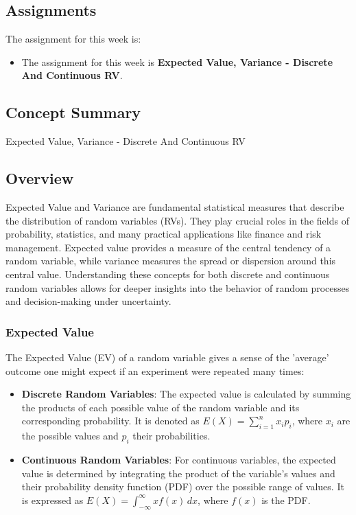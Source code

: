 \subsection{Assignments}

The assignment for this week is:

\begin{itemize}
    \item The assignment for this week is \textbf{Expected Value, Variance - Discrete And Continuous RV}. 
\end{itemize}

\subsection{Concept Summary}

\begin{notes}{Expected Value, Variance - Discrete And Continuous RV}
    \subsection*{Overview}

    Expected Value and Variance are fundamental statistical measures that describe the distribution of random variables (RVs). They play crucial roles in the fields of probability, statistics, and 
    many practical applications like finance and risk management. Expected value provides a measure of the central tendency of a random variable, while variance measures the spread or dispersion 
    around this central value. Understanding these concepts for both discrete and continuous random variables allows for deeper insights into the behavior of random processes and decision-making 
    under uncertainty. \vspace*{1em}
    
    \subsubsection*{Expected Value}
    
    The Expected Value (EV) of a random variable gives a sense of the 'average' outcome one might expect if an experiment were repeated many times:
    \begin{itemize}
        \item \textbf{Discrete Random Variables}: The expected value is calculated by summing the products of each possible value of the random variable and its corresponding probability. It is denoted 
        as $E(X) = \sum_{i=1}^n x_i p_i$, where $x_i$ are the possible values and $p_i$ their probabilities.
        \item \textbf{Continuous Random Variables}: For continuous variables, the expected value is determined by integrating the product of the variable's values and their probability density function 
        (PDF) over the possible range of values. It is expressed as $E(X) = \int_{-\infty}^{\infty} x f(x) \, dx$, where $f(x)$ is the PDF.
    \end{itemize}
    

\end{notes}
